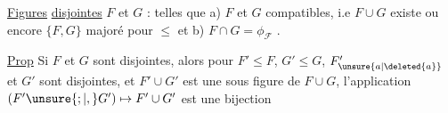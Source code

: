 \uline{Figures} \uline{disjointes}  \uline{$F$} et \uline{$G$} : telles que a) $F$ et $G$ compatibles, i.e $F\cup G$ existe  ou encore $\{F,G\}$ majoré pour $\leq$ et b) $F\cap G=\phi_{\mathcal F}$  .


 \uline{Prop} Si $F$ et $G$ sont disjointes, alors pour $F'\leq F$, $G'\leq G$, $F'_{\unsure{a|\deleted{a}}}$ et $G'$ sont disjointes, et $F'\cup G'$ est une sous figure de $F\cup G$, l'application $(F'\unsure{;|,}G')\mapsto F'\cup G'$ est une bijection 
